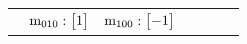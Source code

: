 \documentclass[fleqn,8pt,landscape]{jsarticle}
\begin{document}
\begin{longtable}{ccccccc}
& $ {\rm m}_{010}:\begin{bmatrix} 1 \end{bmatrix} $ & $ {\rm m}_{100}:\begin{bmatrix} -1 \end{bmatrix} $ & $  $ & $  $ & $  $ & $  $ \\
\end{longtable}
\end{document}

